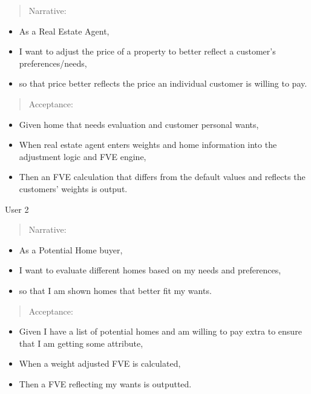 \documentclass[
]{article}
\begin{document}
\begin{quote}
Narrative:
\end{quote}

\begin{itemize}
\item
  As a Real Estate Agent,
\item
  I want to adjust the price of a property to better reflect a
  customer's preferences/needs,
\item
  so that price better reflects the price an individual customer is
  willing to pay.
\end{itemize}

\begin{quote}
Acceptance:
\end{quote}

\begin{itemize}
\item
  Given home that needs evaluation and customer personal wants,
\item
  When real estate agent enters weights and home information into the
  adjustment logic and FVE engine,
\item
  Then an FVE calculation that differs from the default values and
  reflects the customers' weights is output.
\end{itemize}

User 2

\begin{quote}
Narrative:
\end{quote}

\begin{itemize}
\item
  As a Potential Home buyer,
\item
  I want to evaluate different homes based on my needs and preferences,
\item
  so that I am shown homes that better fit my wants.
\end{itemize}

\begin{quote}
Acceptance:
\end{quote}

\begin{itemize}
\item
  Given I have a list of potential homes and am willing to pay extra to
  ensure that I am getting some attribute,
\item
  When a weight adjusted FVE is calculated,
\item
  Then a FVE reflecting my wants is outputted.
\end{itemize}
\end{document}
